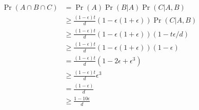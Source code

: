 \documentclass[11pt]{article}
\begin{document}
\begin{solution}
\begin{enumerate}
    \begin{align*}
        \Pr(A \cap B \cap C) &= \Pr(A) \Pr(B | A) \Pr(C | A, B) \\
        &\geq \frac{(1- \epsilon)t}{d} (1 - \epsilon(1 + \epsilon))\Pr(C | A, B) \\
         &\geq \frac{(1- \epsilon)t}{d} (1 - \epsilon(1 + \epsilon))(1 - t\epsilon/d) \tag{3 gives upper bound on the complement of $C | A, B$} \\
         &\geq \frac{(1- \epsilon)t}{d} (1 - \epsilon(1 + \epsilon))(1 - \epsilon) \\
         &= \frac{(1- \epsilon)t}{d} (1 - 2 \epsilon + \epsilon^3) \\
         &\geq \frac{(1- \epsilon)t}{d} \epsilon^3 \tag{$\epsilon$ < 1/2} \\
         &= \frac{(1- \epsilon)}{d} \\
         &\geq \frac{1 - 10 \epsilon}{d}
    \end{align*}
\end{enumerate}

\end{solution}
\end{document}
